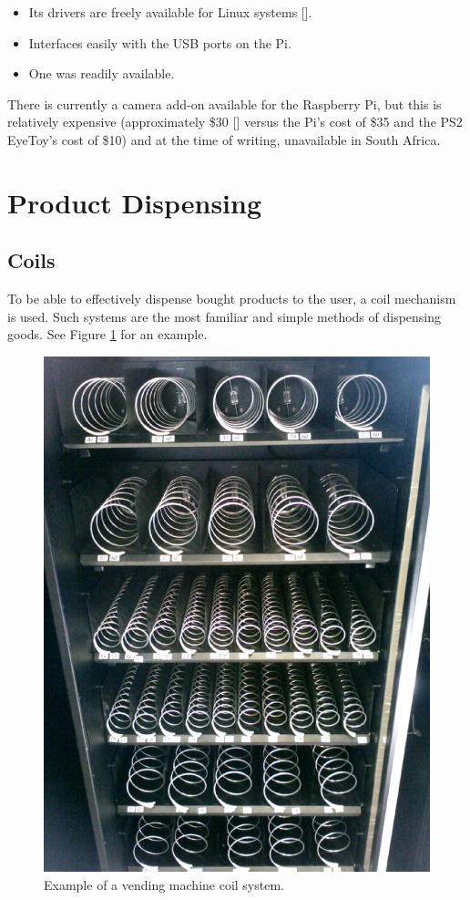 \begin{itemize}
  \item Its drivers are freely available for Linux systems [\cite{website:webcam-drivers}].
  \item Interfaces easily with the USB ports on the Pi.
  \item One was readily available.
\end{itemize}

There is currently a camera add-on available for the Raspberry Pi, but this is relatively
expensive (approximately \$30 [\cite{website:raspi-camera}] versus the Pi's cost of \$35 
and the PS2 EyeToy's cost of \$10) and at the time of writing, unavailable in
South Africa.

\section{Product Dispensing}

\subsection{Coils}

To be able to effectively dispense bought products to the user, a coil mechanism is
used. Such systems are the most familiar and simple methods of dispensing goods. See Figure
\ref{fig:vm-coils} for an example.

\begin{figure}
\centering
\includegraphics[scale=0.2]{vm_coils.eps}
\caption{Example of a vending machine coil system.}
\label{fig:vm-coils}
\end{figure}

